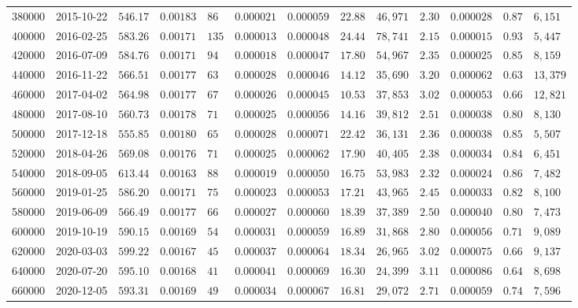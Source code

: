 \begin{tabular}{rllllllllllll}
380000 & 2015-10-22 & $546.17$ & $0.00183$ & $86$ & $0.000021$ & $0.000059$ & $22.88$ & $46,971$ & $2.30$ & $0.000028$ & $0.87$ & $6,151$ \\
400000 & 2016-02-25 & $583.26$ & $0.00171$ & $135$ & $0.000013$ & $0.000048$ & $24.44$ & $78,741$ & $2.15$ & $0.000015$ & $0.93$ & $5,447$ \\
420000 & 2016-07-09 & $584.76$ & $0.00171$ & $94$ & $0.000018$ & $0.000047$ & $17.80$ & $54,967$ & $2.35$ & $0.000025$ & $0.85$ & $8,159$ \\
440000 & 2016-11-22 & $566.51$ & $0.00177$ & $63$ & $0.000028$ & $0.000046$ & $14.12$ & $35,690$ & $3.20$ & $0.000062$ & $0.63$ & $13,379$ \\
460000 & 2017-04-02 & $564.98$ & $0.00177$ & $67$ & $0.000026$ & $0.000045$ & $10.53$ & $37,853$ & $3.02$ & $0.000053$ & $0.66$ & $12,821$ \\
480000 & 2017-08-10 & $560.73$ & $0.00178$ & $71$ & $0.000025$ & $0.000056$ & $14.16$ & $39,812$ & $2.51$ & $0.000038$ & $0.80$ & $8,130$ \\
500000 & 2017-12-18 & $555.85$ & $0.00180$ & $65$ & $0.000028$ & $0.000071$ & $22.42$ & $36,131$ & $2.36$ & $0.000038$ & $0.85$ & $5,507$ \\
520000 & 2018-04-26 & $569.08$ & $0.00176$ & $71$ & $0.000025$ & $0.000062$ & $17.90$ & $40,405$ & $2.38$ & $0.000034$ & $0.84$ & $6,451$ \\
540000 & 2018-09-05 & $613.44$ & $0.00163$ & $88$ & $0.000019$ & $0.000050$ & $16.75$ & $53,983$ & $2.32$ & $0.000024$ & $0.86$ & $7,482$ \\
560000 & 2019-01-25 & $586.20$ & $0.00171$ & $75$ & $0.000023$ & $0.000053$ & $17.21$ & $43,965$ & $2.45$ & $0.000033$ & $0.82$ & $8,100$ \\
580000 & 2019-06-09 & $566.49$ & $0.00177$ & $66$ & $0.000027$ & $0.000060$ & $18.39$ & $37,389$ & $2.50$ & $0.000040$ & $0.80$ & $7,473$ \\
600000 & 2019-10-19 & $590.15$ & $0.00169$ & $54$ & $0.000031$ & $0.000059$ & $16.89$ & $31,868$ & $2.80$ & $0.000056$ & $0.71$ & $9,089$ \\
620000 & 2020-03-03 & $599.22$ & $0.00167$ & $45$ & $0.000037$ & $0.000064$ & $18.34$ & $26,965$ & $3.02$ & $0.000075$ & $0.66$ & $9,137$ \\
640000 & 2020-07-20 & $595.10$ & $0.00168$ & $41$ & $0.000041$ & $0.000069$ & $16.30$ & $24,399$ & $3.11$ & $0.000086$ & $0.64$ & $8,698$ \\
660000 & 2020-12-05 & $593.31$ & $0.00169$ & $49$ & $0.000034$ & $0.000067$ & $16.81$ & $29,072$ & $2.71$ & $0.000059$ & $0.74$ & $7,596$ \\

\end{tabular}
